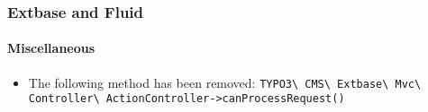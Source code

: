 %

\begin{frame}[fragile]
	\frametitle{Extbase and Fluid}
	\framesubtitle{Miscellaneous}


	\begin{itemize}
		\item The following method has been removed:\newline
			\smaller\texttt{TYPO3\textbackslash
				CMS\textbackslash
				Extbase\textbackslash
				Mvc\textbackslash
				Controller\textbackslash
				ActionController->canProcessRequest()}\normalsize
	\end{itemize}

\end{frame}

